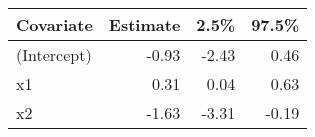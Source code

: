 \begin{table}[ht]
\centering
\begin{tabular}{lrrr}
  \hline
Covariate & Estimate & 2.5\% & 97.5\% \\ 
  \hline
(Intercept) & -0.93 & -2.43 & 0.46 \\ 
  x1 & 0.31 & 0.04 & 0.63 \\ 
  x2 & -1.63 & -3.31 & -0.19 \\ 
   \hline
\end{tabular}
\end{table}
